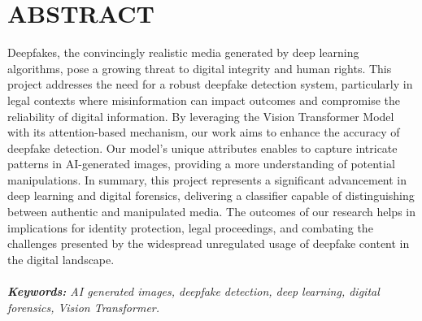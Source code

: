 


\section*{ABSTRACT}
\justify

Deepfakes, the convincingly realistic  media generated by deep learning algorithms, pose a growing threat to digital integrity and human rights. This project addresses the need for a robust deepfake detection system, particularly in legal contexts where misinformation can impact outcomes and compromise the reliability of digital information. By leveraging the Vision Transformer Model with its attention-based mechanism, our work aims to enhance the accuracy of deepfake detection. Our model's unique attributes enables to capture intricate patterns in AI-generated images, providing a more understanding of potential manipulations. In summary, this project represents a significant advancement in deep learning and digital forensics, delivering a classifier capable of distinguishing between authentic and manipulated media. The outcomes of our research helps in implications for identity protection, legal proceedings, and combating the challenges presented by the widespread unregulated usage of deepfake content in the digital landscape.\\
\\
\textit{\textbf{Keywords:} AI generated images, deepfake detection, deep learning, digital forensics, Vision Transformer.}


